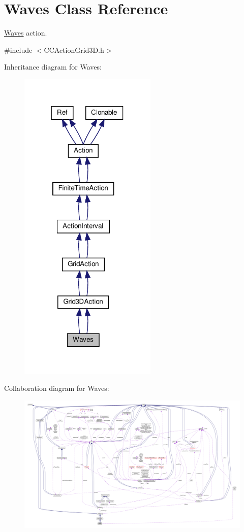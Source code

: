\hypertarget{classWaves}{}\section{Waves Class Reference}
\label{classWaves}


\hyperlink{classWaves}{Waves} action.  




{\ttfamily \#include $<$C\+C\+Action\+Grid3\+D.\+h$>$}



Inheritance diagram for Waves\+:
\nopagebreak
\begin{figure}[H]
\begin{center}
\leavevmode
\includegraphics[width=186pt]{classWaves__inherit__graph}
\end{center}
\end{figure}


Collaboration diagram for Waves\+:
\nopagebreak
\begin{figure}[H]
\begin{center}
\leavevmode
\includegraphics[width=350pt]{classWaves__coll__graph}
\end{center}
\end{figure}
